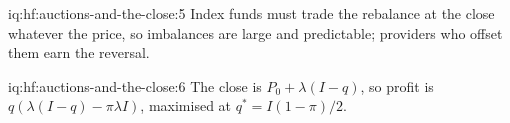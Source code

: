 \begin{solution}{iq:hf:auctions-and-the-close:5}
Index funds must trade the rebalance at the close whatever the price, so imbalances are large and predictable; providers who offset them earn the
reversal.
\end{solution}

\begin{solution}{iq:hf:auctions-and-the-close:6}
The close is $P_0+\lambda(I-q)$, so profit is $q(\lambda(I-q)-\pi\lambda I)$, maximised at $q^\ast=I(1-\pi)/2$.
\end{solution}
